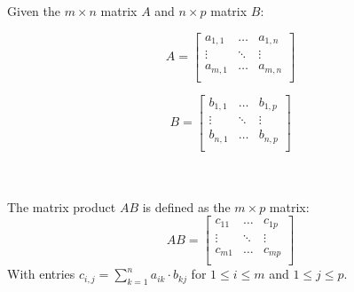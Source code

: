 \begin{mydef}
	Given the $m \times n$ matrix $A$ and $n \times p$ matrix $B$:
	\begin{minipage}{0.4\linewidth}
		\begin{equation*}
		A = 
		\begin{bmatrix}
			a_{1 ,1} & \ldots & a_{1, n} \\
			\vdots & \ddots & \vdots \\
			a_{m ,1} & \ldots & a_{m, n} \\
		\end{bmatrix}
	\end{equation*}
\end{minipage}	
\begin{minipage}[b]{0.59\linewidth}
	\begin{equation*}
		B = 
		\begin{bmatrix}
			b_{1 ,1} & \ldots & b_{1, p} \\
			\vdots & \ddots & \vdots \\
			b_{n ,1} & \ldots & b_{n, p} \\
		\end{bmatrix}
	\end{equation*}
\end{minipage}
\\ \\
The matrix product $AB$ is defined as the $m \times p$ matrix:
\begin{equation*}
		AB = 
		\begin{bmatrix}
			c_{11} & \ldots & c_{1p} \\
			\vdots & \ddots & \vdots \\
			c_{m1} & \ldots & c_{mp} \\
		\end{bmatrix}
	\end{equation*} 
	With entries $c_{i,j} = \sum_{k=1}^n a_{ik}\cdot b_{kj}$ for $1 \leq i \leq m$ and $1 \leq j \leq p$.
	\end{mydef}

